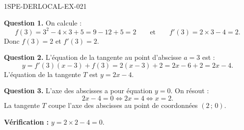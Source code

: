 \begin{corrige}{1SPE-DERLOCAL-EX-021}

\textbf{Question 1.} On calcule :
\[
f(3) = 3^2 - 4 \times 3 + 5 = 9 - 12 + 5 = 2 \qquad \text{et} \qquad f'(3) = 2 \times 3 - 4 = 2.
\]
Donc $\boxed{f(3) = 2}$ et $\boxed{f'(3) = 2}$.

\textbf{Question 2.} L'équation de la tangente au point d'abscisse $a = 3$ est :
\[
y = f'(3)(x - 3) + f(3) = 2(x - 3) + 2 = 2x - 6 + 2 = 2x - 4.
\]
L'équation de la tangente $T$ est $\boxed{y = 2x - 4}$.

\textbf{Question 3.} L'axe des abscisses a pour équation $y = 0$. On résout :
\[
2x - 4 = 0 \iff 2x = 4 \iff x = 2.
\]
La tangente $T$ coupe l'axe des abscisses au point de coordonnées $\boxed{(2\,;\,0)}$.

\textbf{Vérification :} $y = 2 \times 2 - 4 = 0$. \checkmark

\end{corrige}

